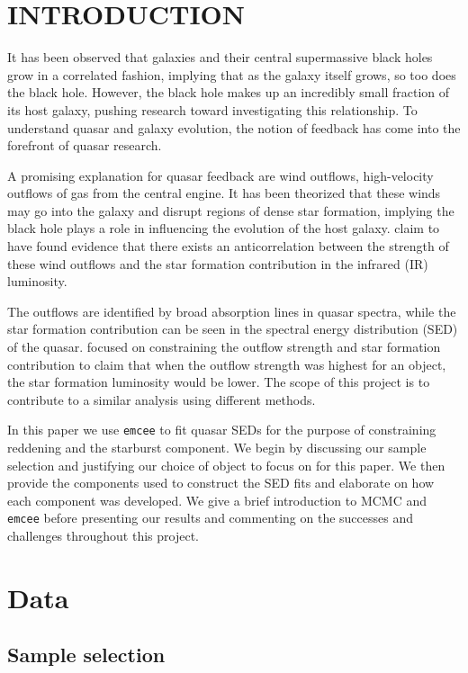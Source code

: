 \section{INTRODUCTION}
\label{introduction}

It has been observed that galaxies and their central supermassive black holes grow in a correlated fashion, implying that 
as the galaxy itself grows, so too does the black hole. However, the black hole makes up an incredibly small fraction of its host galaxy, 
pushing research toward investigating this relationship. To understand quasar and galaxy evolution, the notion of feedback has come into 
the forefront of quasar research.

A promising explanation for quasar feedback are wind outflows, high-velocity outflows of gas from the central engine. It has been 
theorized that these winds may go into the galaxy and disrupt regions of dense star formation, implying the black hole plays a role 
in influencing the evolution of the host galaxy. \cite{farrah2012} claim to have found evidence that there exists an anticorrelation 
between the strength 
of these wind outflows and the star formation contribution in the infrared (IR) luminosity. 

The outflows are identified by broad absorption lines in quasar spectra, while the star formation contribution can be seen in the 
spectral energy distribution (SED) of the quasar. \cite{farrah2012} focused on constraining the outflow strength and 
star formation contribution to claim that when the outflow strength was highest for an object, the star formation luminosity would be lower. 
The scope of this project is to contribute to a similar analysis using different methods. 

In this paper we use \texttt{emcee} to fit quasar SEDs for the purpose of constraining reddening and the starburst component. We begin by 
discussing our sample selection and justifying our choice of object to focus on for this paper. We then provide the components 
used to construct the SED fits and elaborate on how each component was developed. We give a brief introduction to MCMC and \texttt{emcee} before 
presenting our results and commenting on the successes and challenges throughout this project. 

\section{Data}
\label{sec:data}

\subsection{Sample selection}
\label{sec:sample}

